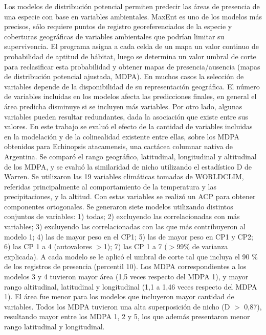 {Los modelos de distribución potencial permiten predecir las áreas de presencia de una especie con base en variables ambientales. MaxEnt es uno de los modelos más precisos, sólo requiere puntos de registro georeferenciados de la especie y coberturas geográficas de variables ambientales que podrían limitar su supervivencia. El programa asigna a cada celda de un mapa un valor continuo de probabilidad de aptitud de hábitat, luego se determina un valor umbral de corte para reclasificar esta probabilidad y obtener mapas de presencia/ausencia (mapas de distribución potencial ajustada, MDPA). En muchos casos la selección de variables depende de la disponibilidad de su representación geográfica. El número de variables incluidas en los modelos afecta las predicciones finales, en general el área predicha disminuye si se incluyen más variables. Por otro lado, algunas variables pueden resultar redundantes, dada la asociación que existe entre sus valores. En este trabajo se evaluó el efecto de la cantidad de variables incluidas en la modelación y de la colinealidad existente entre ellas, sobre los MDPA obtenidos para Echinopsis atacamensis, una cactácea columnar nativa de Argentina. Se comparó el rango geográfico, latitudinal, longitudinal y altitudinal de los MDPA, y se evaluó la similaridad de nicho utilizando el estadístico D de Warren. Se utilizaron las 19 variables climáticas tomadas de WORLDCLIM, referidas principalmente al comportamiento de la temperatura y las precipitaciones, y la altitud. Con estas variables se realizó un ACP para obtener componentes ortogonales. Se generaron siete modelos utilizando distintos conjuntos de variables: 1) todas; 2) excluyendo las correlacionadas con más variables; 3) excluyendo las correlacionadas con las que más contribuyeron al modelo 1; 4) las de mayor peso en el CP1; 5) las de mayor peso en CP1 y CP2; 6) las CP 1 a 4 (autovalores $>$1); 7) las CP 1 a 7 ($>$99\% de varianza explicada). A cada modelo se le aplicó el umbral de corte tal que incluya el 90 \% de los registros de presencia (percentil 10). Los MDPA correspondientes a los modelos 3 y 4 tuvieron mayor área (1,5 veces respecto del MDPA 1), y mayor rango altitudinal, latitudinal y longitudinal (1,1 a 1,46 veces respecto del MDPA 1). El área fue menor para los modelos que incluyeron mayor cantidad de variables. Todos los MDPA tuvieron una alta superposición de nicho (D $>$ 0,87), resultando mayor entre los MDPA 1, 2 y 5, los que además presentaron menor rango latitudinal y longitudinal.}
